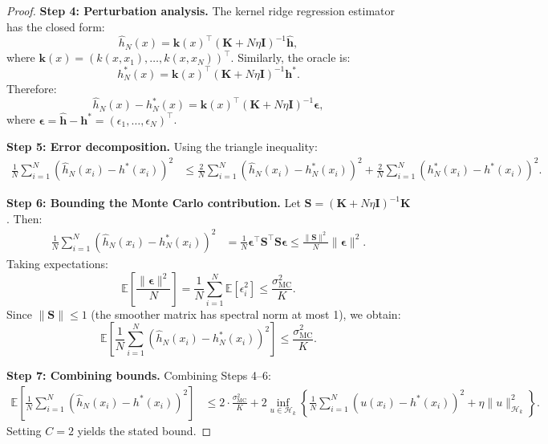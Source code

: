 \documentclass[10pt,a4paper]{amsart}
\newcommand{\E}{\mathbb{E}}
\newcommand{\RKHS}{\mathcal{H}_k}
\newcommand{\bI}{\mathbf{I}}
\newcommand{\bK}{\mathbf{K}}
\newcommand{\bS}{\mathbf{S}}
\begin{document}
\begin{proof}
\textbf{Step 4: Perturbation analysis.}
The kernel ridge regression estimator has the closed form:
\begin{equation}
\widehat{h}_N(x) = \mathbf{k}(x)^\top (\bK + N\eta \bI)^{-1} \widehat{\mathbf{h}},
\end{equation}
where $\mathbf{k}(x) = (k(x, x_1), \ldots, k(x, x_N))^\top$. Similarly, the oracle is:
\begin{equation}
h_N^*(x) = \mathbf{k}(x)^\top (\bK + N\eta \bI)^{-1} \mathbf{h}^*.
\end{equation}
Therefore:
\begin{equation}
\widehat{h}_N(x) - h_N^*(x) = \mathbf{k}(x)^\top (\bK + N\eta \bI)^{-1} \boldsymbol{\epsilon},
\end{equation}
where $\boldsymbol{\epsilon} = \widehat{\mathbf{h}} - \mathbf{h}^* = (\epsilon_1, \ldots, \epsilon_N)^\top$.

\textbf{Step 5: Error decomposition.}
Using the triangle inequality:
\begin{align}
\frac{1}{N}\sum_{i=1}^N (\widehat{h}_N(x_i) - h^*(x_i))^2 &\leq \frac{2}{N}\sum_{i=1}^N (\widehat{h}_N(x_i) - h_N^*(x_i))^2 + \frac{2}{N}\sum_{i=1}^N (h_N^*(x_i) - h^*(x_i))^2.
\end{align}

\textbf{Step 6: Bounding the Monte Carlo contribution.}
Let $\bS = (\bK + N\eta \bI)^{-1} \bK$. Then:
\begin{align}
\frac{1}{N}\sum_{i=1}^N (\widehat{h}_N(x_i) - h_N^*(x_i))^2 &= \frac{1}{N}\boldsymbol{\epsilon}^\top \bS^\top \bS \boldsymbol{\epsilon} \leq \frac{\|\bS\|^2}{N} \|\boldsymbol{\epsilon}\|^2.
\end{align}
Taking expectations:
\begin{equation}
\E\left[\frac{\|\boldsymbol{\epsilon}\|^2}{N}\right] = \frac{1}{N}\sum_{i=1}^N \E[\epsilon_i^2] \leq \frac{\sigma_{\mathrm{MC}}^2}{K}.
\end{equation}
Since $\|\bS\| \leq 1$ (the smoother matrix has spectral norm at most 1), we obtain:
\begin{equation}
\E\left[\frac{1}{N}\sum_{i=1}^N (\widehat{h}_N(x_i) - h_N^*(x_i))^2\right] \leq \frac{\sigma_{\mathrm{MC}}^2}{K}.
\end{equation}

\textbf{Step 7: Combining bounds.}
Combining Steps 4--6:
\begin{align}
\E\left[\frac{1}{N}\sum_{i=1}^N (\widehat{h}_N(x_i) - h^*(x_i))^2\right] &\leq 2 \cdot \frac{\sigma_{\mathrm{MC}}^2}{K} + 2 \inf_{u \in \RKHS}\left\{\frac{1}{N}\sum_{i=1}^N(u(x_i) - h^*(x_i))^2 + \eta\|u\|_{\RKHS}^2\right\}.
\end{align}
Setting $C = 2$ yields the stated bound.
\end{proof}
\end{document}
